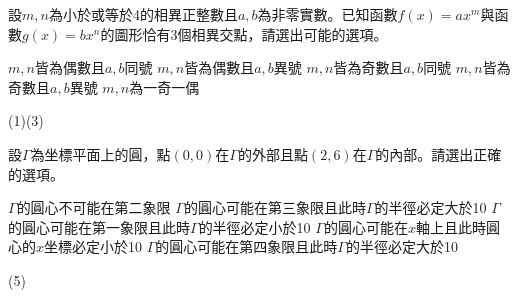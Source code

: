 \begin{QUESTION}
    \begin{QBODY}	設$m,n$為小於或等於4的相異正整數且$a,b$為非零實數。已知函數$f(x)=a{{x}^{m}}$與函數$g(x)=b{{x}^{n}}$的圖形恰有3個相異交點，請選出可能的選項。
        \begin{QOPS}
        \QOP $m,n$皆為偶數且$a,b$同號 
        \QOP $m,n$皆為偶數且$a,b$異號
        \QOP $m,n$皆為奇數且$a,b$同號
        \QOP $m,n$皆為奇數且$a,b$異號
        \QOP $m,n$為一奇一偶
        \end{QOPS}
    \end{QBODY}
    \begin{QFROMS}
    \end{QFROMS}
    \begin{QTAGS}
    \end{QTAGS}
    \begin{QANS}
        (1)(3)
    \end{QANS}
    \begin{QSOL}
    \end{QSOL}
    \begin{QEMPTYSPACE}
    \end{QEMPTYSPACE}
\end{QUESTION}
\begin{QUESTION}
    \begin{QBODY}
        設$\Gamma $為坐標平面上的圓，點$(0,0)$在$\Gamma $的外部且點$(2,6)$在$\Gamma $的內部。請選出正確的選項。
        \begin{QOPS}
        \QOP $\Gamma $的圓心不可能在第二象限
        \QOP $\Gamma $的圓心可能在第三象限且此時$\Gamma $的半徑必定大於10
        \QOP $\Gamma $的圓心可能在第一象限且此時$\Gamma $的半徑必定小於10
        \QOP $\Gamma $的圓心可能在$x$軸上且此時圓心的$x$坐標必定小於10
        \QOP $\Gamma $的圓心可能在第四象限且此時$\Gamma $的半徑必定大於10
        \end{QOPS}
    \end{QBODY}
    \begin{QFROMS}
    \end{QFROMS}
    \begin{QTAGS}
    \end{QTAGS}
    \begin{QANS}
        (5)
    \end{QANS}
    \begin{QSOL}
    \end{QSOL}
    \begin{QEMPTYSPACE}
    \end{QEMPTYSPACE}
\end{QUESTION}
